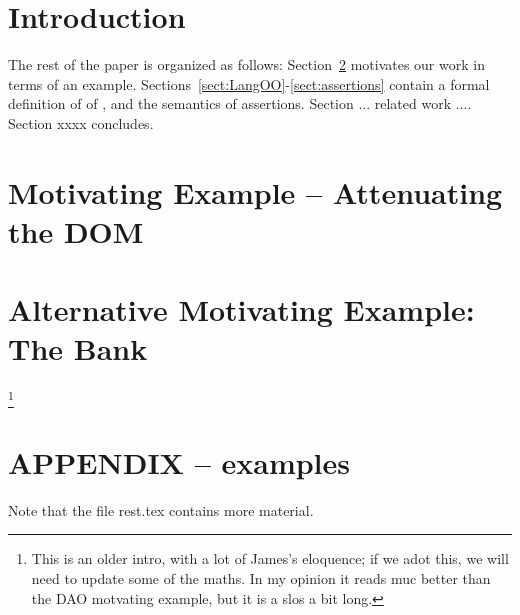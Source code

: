 \documentclass[acmsmall,screen]{acmart}
\begin{document}
\maketitle

\section{Introduction}


The rest of the paper is organized as follows: Section~\ref{sect:mitave:DOM} 
motivates our work in terms of an example. Sections~\ref{sect:LangOO}-\ref{sect:assertions} contain a formal definition of of \LangOO, and the semantics of assertions. Section ... related work .... Section xxxx concludes.



\section{Motivating Example -- Attenuating the DOM}
\label{sect:mitave:DOM}



\section{Alternative Motivating Example: The Bank}\footnote{This is an older intro, with a lot of James's eloquence; if we adot this, we will need to update some of the maths. In my opinion it reads muc better than the DAO motvating example, but it is a slos a bit long.}








\section*{APPENDIX -- examples}
Note that the file rest.tex contains more material.

\appendix

\appendix


\end{document}
